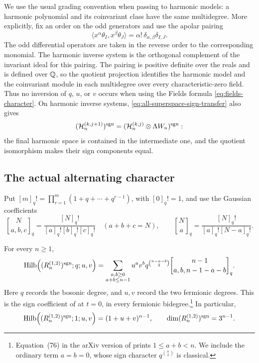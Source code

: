 We use the usual grading convention when passing to harmonic
models: a harmonic polynomial and its coinvariant class have the
same multidegree.  More explicitly, fix an order on the odd
generators and use the apolar pairing
\[
 \langle x^\alpha\theta_I,x^\beta\theta_J\rangle
   =\alpha!\,\delta_{\alpha,\beta}\delta_{I,J}.
\]
The odd differential operators are taken in the reverse order to
the corresponding monomial.  The harmonic inverse system is the
orthogonal complement of the invariant ideal for this pairing.
The pairing is positive definite over the reals and is defined
over $\mathbb Q$, so the quotient projection identifies the harmonic
model and the coinvariant module in each multidegree over every
characteristic-zero field.  Thus no inversion of $q$, $u$, or $v$
occurs when using the Fields formula \eqref{eq:fields-character}.
On harmonic inverse systems, \eqref{eq:all-superspace-sign-transfer}
also gives
\[
 (\mathcal H_n^{(k,j+1)})^{\operatorname{sgn}}
   =(\mathcal H_n^{(k,j)}\otimes\Lambda W_n)^{\operatorname{sgn}}:
\]
the final harmonic space is contained in the intermediate one,
and the quotient isomorphism makes their sign components equal.

\subsection{The actual alternating character}

Put $[m]_q!=\prod_{r=1}^m(1+q+\cdots+q^{r-1})$, with
$[0]_q!=1$, and use the Gaussian coefficients
\[
 \genfrac{[}{]}{0pt}{}{N}{a,b,c}_q
    =\frac{[N]_q!}{[a]_q![b]_q![c]_q!}
 \quad(a+b+c=N),
 \qquad
 \genfrac{[}{]}{0pt}{}{N}{a}_q
    =\frac{[N]_q!}{[a]_q![N-a]_q!}.
\]

\begin{theorem}[The $t=0$ Theta sign component]
\label{thm:one-boson-two-fermion-sign}
For every $n\geq1$,
\begin{equation}\label{eq:one-boson-two-fermion-sign}
 \operatorname{Hilb}\!\left((R_n^{(1,2)})^{\sgn};q;u,v\right)
 =\sum_{\substack{a,b\geq0\\a+b\leq n-1}}
 u^av^b q^{\binom{n-a-b}{2}}
 \genfrac{[}{]}{0pt}{}{n-1}{a,b,n-1-a-b}_q.
\end{equation}
Here $q$ records the bosonic degree, and $u,v$ record the two
fermionic degrees.  This is the sign coefficient of
\cite[Conjecture~8.2]{DIV2021} at $t=0$, in every fermionic
bidegree.\footnote{Equation~(76) in the arXiv version of
\cite{DIV2021} prints $1\leq a+b<n$.  We include the ordinary
term $a=b=0$, whose sign character $q^{\binom n2}$ is classical.}
In particular,
\begin{equation}\label{eq:one-boson-two-fermion-sign-dimension}
 \operatorname{Hilb}\!\left((R_n^{(1,2)})^{\operatorname{sgn}};1;u,v\right)
 =(1+u+v)^{n-1},
 \qquad
 \dim(R_n^{(1,2)})^{\operatorname{sgn}}=3^{n-1}.
\end{equation}
\end{theorem}

